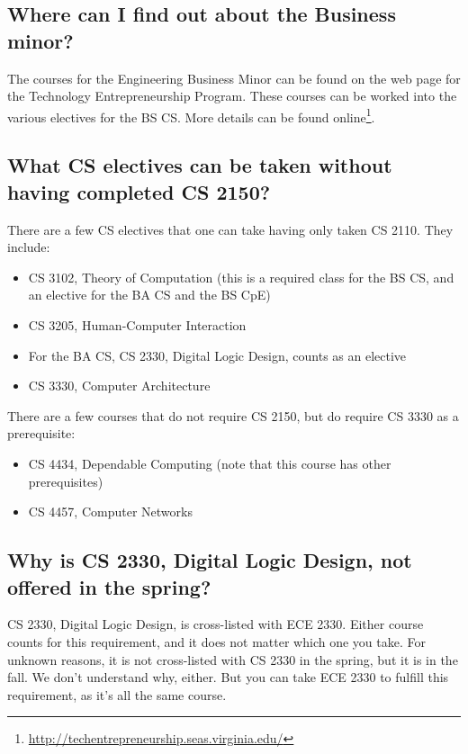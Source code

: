 \documentclass[10pt,letter,twocolumn]{book}
\newenvironment{itemlist}{
\begin{itemize}
\setlength{\itemsep}{0pt}
\setlength{\parskip}{0pt}}
{\end{itemize}}
\newcommand{\myurl}[1]{\footnote{\scriptsize\url{#1}}}
\begin{document}
\subsection{Where can I find out about the Business minor?}

The courses for the Engineering Business Minor can be found on the web
page for the Technology Entrepreneurship Program.  These courses can
be worked into the various electives for the BS CS. More details can
be found online\myurl{http://techentrepreneurship.seas.virginia.edu/}.


\subsection{What CS electives can be taken without having completed CS
  2150?}

There are a few CS electives that one can take having only taken CS
2110.  They include:
\begin{itemlist}
\item CS 3102, Theory of Computation (this is a required class for the
  BS CS, and an elective for the BA CS and the BS CpE)
\item CS 3205, Human-Computer Interaction
\item For the BA CS, CS 2330, Digital Logic Design, counts as an
  elective
\item CS 3330, Computer Architecture
\end{itemlist}

There are a few courses that do not require CS 2150, but do require CS
3330 as a prerequisite:

\begin{itemlist}
\item CS 4434, Dependable Computing (note that this course
    has other prerequisites)
\item CS 4457, Computer Networks
\end{itemlist}

\subsection{Why is CS 2330, Digital Logic Design, not offered
  in the spring?}
\label{cs2330}

CS 2330, Digital Logic Design, is cross-listed with ECE 2330.  Either
course counts for this requirement, and it does not matter which one
you take.  For unknown reasons, it is not cross-listed with CS 2330 in
the spring, but it is in the fall.  We don't understand why, either.
But you can take ECE 2330 to fulfill this requirement, as it's all the
same course.
\end{document}
